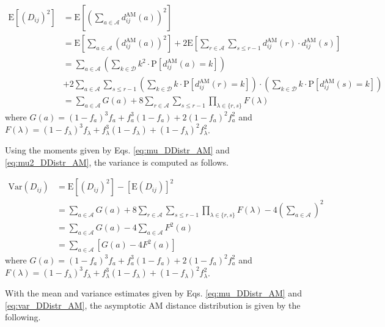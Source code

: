 \documentclass[10pt,letterpaper]{article}\usepackage[]{graphicx}\usepackage[]{color}
\begin{document}
\begin{equation}\label{eq:mu2_DDistr_AM}
\begin{aligned}
\text{E}\left[\left(D_{ij}\right)^2\right] &= \text{E}\left[\left(\sum_{a \in \mathcal{A}} d^\text{AM}_{ij}(a)\right)^2\right] \\
&= \text{E}\left[\sum_{a \in \mathcal{A}} \left(d^\text{AM}_{ij}(a)\right)^2\right] + 2 \text{E}\left[\sum_{r \in \mathcal{A}} \sum_{s \leq r - 1} d^\text{AM}_{ij}(r) \cdot d^\text{AM}_{ij}(s)\right] \\
&= \sum_{a \in \mathcal{A}} \left(\sum_{k \in \mathcal{D}} k^2 \cdot \text{P}\left[d^\text{AM}_{ij}(a) = k\right]\right) \\
&+ 2\sum_{a \in \mathcal{A}} \sum_{s \leq r - 1} \left(\sum_{k \in \mathcal{D}} k \cdot \text{P}\left[d^\text{AM}_{ij}(r) = k\right]\right) \cdot \left(\sum_{k \in \mathcal{D}} k \cdot \text{P}\left[d^\text{AM}_{ij}(s) = k\right]\right) \\
&= \sum_{a \in \mathcal{A}} G(a) + 8 \sum_{r \in \mathcal{A}} \sum_{s \leq r - 1} \prod_{\lambda \in \{r,s\}} F(\lambda)
\end{aligned}
\end{equation}
where $G(a) = (1 - f_a)^3 f_a + f^3_a (1 - f_a) + 2 (1 - f_a)^2 f^2_a$ and $F(\lambda) = (1 - f_\lambda)^3 f_\lambda + f^3_\lambda (1 - f_\lambda) + (1 - f_\lambda)^2 f^2_\lambda$.

Using the moments given by Eqs. \ref{eq:mu_DDistr_AM} and \ref{eq:mu2_DDistr_AM}, the variance is computed as follows.

\begin{equation}\label{eq:var_DDistr_AM}
\begin{aligned}
\text{Var}(D_{ij}) &= \text{E}\left[(D_{ij})^2\right] - \left[\text{E}(D_{ij})\right]^2 \\
&= \sum_{a \in \mathcal{A}} G(a) + 8\sum_{r \in \mathcal{A}} \sum_{s \leq r - 1} \prod_{\lambda \in \{r,s\}} F(\lambda) - 4\left(\sum_{a \in \mathcal{A}}\right)^2 \\
&= \sum_{a \in \mathcal{A}} G(a) - 4\sum_{a \in \mathcal{A}}F^2(a) \\
&= \sum_{a \in \mathcal{A}} \left[G(a)- 4F^2(a)\right]
\end{aligned}
\end{equation}
where $G(a) = (1 - f_a)^3 f_a + f^3_a (1 - f_a) + 2 (1 - f_a)^2 f^2_a$ and $F(\lambda) = (1 - f_\lambda)^3 f_\lambda + f^3_\lambda (1 - f_\lambda) + (1 - f_\lambda)^2 f^2_\lambda$.

With the mean and variance estimates given by Eqs. \ref{eq:mu_DDistr_AM} and \ref{eq:var_DDistr_AM}, the asymptotic AM distance distribution is given by the following.
\end{document}
